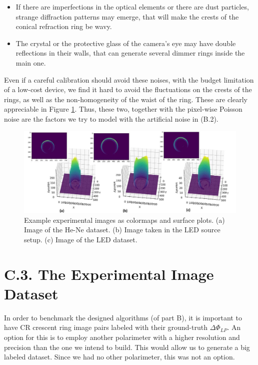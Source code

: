 \documentclass[11pt, a4paper, twoside]{article} %
\begin{document}
\begin{itemize}
\item If there are imperfections in the optical elements or there are dust particles, strange diffraction patterns may emerge, that will make the crests of the conical refraction ring be wavy. 
\item The crystal or the protective glass of the camera's eye may have double reflections in their walls, that can generate several dimmer rings inside the main one.\vspace{-0.2cm}
\end{itemize}
Even if a careful calibration should avoid these noises, with the budget limitation of a low-cost device, we find it hard to avoid the fluctuations on the crests of the rings, as well as the non-homogeneity of the waist of the ring. These are clearly appreciable in Figure \ref{fig:expnoise}. Thus, these two, together with the pixel-wise
Poisson noise are the factors we try to model with the artificial noise in (B.2).\vspace{0.1cm}
\begin{figure}[h!] 
     \centering 
    \includegraphics[width=\linewidth]{exp.jpg}
\caption{Example experimental images as colormaps and surface plots. (a) Image of the He-Ne dataset. (b) Image taken in the LED source setup. (c) Image of the LED dataset. }
        \label{fig:expnoise}
\end{figure}
\vspace{-0.5cm}
\section*{C.3. The Experimental Image Dataset\vspace{-0.1cm}}
In order to benchmark the designed algorithms (of part B), it is important to have CR crescent ring image pairs labeled with their ground-truth $\Delta \Phi_{LP}$. An option for this is to employ another polarimeter with a higher resolution and precision than the one we intend to build. This would allow us to generate a big labeled dataset. Since we had no other polarimeter, this was not an option.
\end{document}
